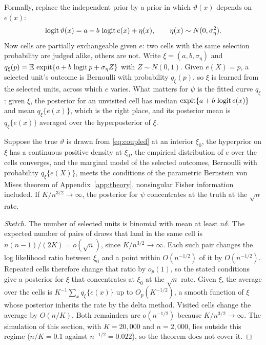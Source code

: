 Formally, replace the independent prior by a prior in which $\vartheta(x)$ depends on $e(x)$:
\begin{equation}
\operatorname{logit}\vartheta(x) = a + b\,\operatorname{logit} e(x) + \eta(x), \qquad \eta(x) \sim N(0, \sigma_\eta^2).
\label{eq:coupled}
\end{equation}
Now cells are partially exchangeable given $e$: two cells with the same selection probability are judged alike, others are not. Write $\xi = (a, b, \sigma_\eta)$ and $q_\xi(p) = \mathbb{E}\,\operatorname{expit}\{a + b\,\operatorname{logit} p + \sigma_\eta Z\}$ with $Z \sim N(0, 1)$. Given $e(X) = p$, a selected unit's outcome is Bernoulli with probability $q_\xi(p)$, so $\xi$ is learned from the selected units, across which $e$ varies. What matters for $\psi$ is the fitted curve $q_\xi$: given $\xi$, the posterior for an unvisited cell has median $\operatorname{expit}\{a + b\,\operatorname{logit} e(x)\}$ and mean $q_\xi\{e(x)\}$, which is the right place, and its posterior mean is $q_\xi\{e(x)\}$ averaged over the hyperposterior of $\xi$.

\begin{theorem}
Suppose the true $\vartheta$ is drawn from \eqref{eq:coupled} at an interior $\xi_0$, the hyperprior on $\xi$ has a continuous positive density at $\xi_0$, the empirical distribution of $e$ over the cells converges, and the marginal model of the selected outcomes, Bernoulli with probability $q_\xi\{e(X)\}$, meets the conditions of the parametric Bernstein von Mises theorem of Appendix~\ref{app:theory}, nonsingular Fisher information included. If $K/n^{3/2} \to \infty$, the posterior for $\psi$ concentrates at the truth at the $\sqrt{n}$ rate.
\end{theorem}

\begin{proof}[Sketch]
The number of selected units is binomial with mean at least $n\delta$. The expected number of pairs of draws that land in the same cell is $n(n - 1)/(2K) = o(\sqrt{n})$, since $K/n^{3/2} \to \infty$. Each such pair changes the log likelihood ratio between $\xi_0$ and a point within $O(n^{-1/2})$ of it by $O(n^{-1/2})$. Repeated cells therefore change that ratio by $o_p(1)$, so the stated conditions give a posterior for $\xi$ that concentrates at $\xi_0$ at the $\sqrt{n}$ rate. Given $\xi$, the average over the cells is $K^{-1}\sum_x q_\xi\{e(x)\}$ up to $O_p(K^{-1/2})$, a smooth function of $\xi$ whose posterior inherits the rate by the delta method. Visited cells change the average by $O(n/K)$. Both remainders are $o(n^{-1/2})$ because $K/n^{3/2} \to \infty$. The simulation of this section, with $K = 20{,}000$ and $n = 2{,}000$, lies outside this regime ($n/K = 0.1$ against $n^{-1/2} = 0.022$), so the theorem does not cover it.
\end{proof}


